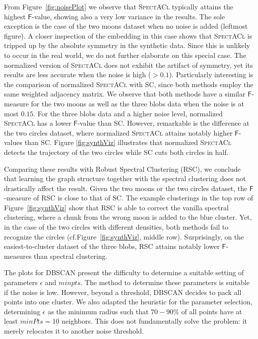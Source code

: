 From Figure~\ref{fig:noisePlot} we observe that \textsc{SpectACl} typically attains the highest $\mathsf{F}$-value, showing also a very low variance in the results. The sole exception is the case of the two moons dataset when no noise is added (leftmost figure). A closer inspection of the embedding in this case shows that \textsc{SpectACl} is tripped up by the absolute symmetry in the synthetic data. Since this is unlikely to occur in the real world, we do not further elaborate on this special case. 
The normalized version of \textsc{SpectACl} does not exhibit the artifact of symmetry, yet its results are less accurate when the noise is high ($>0.1$). Particularly interesting is the comparison of normalized \textsc{SpectACl} with \textsc{SC}, since both methods employ the same weighted adjacency matrix. We observe that both methods have a similar $\mathsf{F}$-measure for the two moons as well as the three blobs data when the noise is at most $0.15$. For the three blobs data and a higher noise level, normalized \textsc{SpectACl} has a lower $\mathsf{F}$-value than \textsc{SC}. However, remarkable is the difference at the two circles dataset, where  normalized \textsc{SpectACl} attains notably higher $\mathsf{F}$-values than \textsc{SC}. Figure \ref{fig:synthViz} illustrates that normalized \textsc{SpectACl} detects the trajectory of the two circles while \textsc{SC} cuts both circles in half. 

Comparing these results with Robust Spectral Clustering (\textsc{RSC}), we conclude that learning the graph structure together with the spectral clustering does not drastically affect the result. Given the two moons or the two circles dataset, the $\mathsf{F}$-measure of \textsc{RSC} is close to that of \textsc{SC}. The example clusterings in the top row of Figure~\ref{fig:synthViz} show that \textsc{RSC} is able to correct the vanilla spectral clustering, where a chunk from the wrong moon is added to the blue cluster. Yet, in the case of the two circles with different densities, both methods fail to recognize the circles (cf.\@ Figure~\ref{fig:synthViz}, middle row). Surprisingly, on the easiest-to-cluster dataset of the three blobs, \textsc{RSC} attains notably lower $\mathsf{F}$-measures than spectral clustering.

The plots for DBSCAN present the difficulty to determine a suitable setting of parameters $\epsilon$ and $minpts$. The method to determine these parameters is suitable if the noise is low. However, beyond a threshold, DBSCAN decides to pack all points into one cluster. We also adapted the heuristic for the parameter selection, determining $\epsilon$ as the minimum radius such that $70-90\%$ of all points have at least $minPts=10$ neighbors. This does not fundamentally solve the problem: it merely relocates it to another noise threshold.
